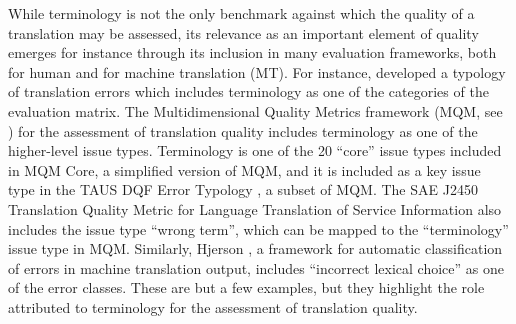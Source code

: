 While terminology is not the only benchmark against which the quality of a translation may be assessed, its relevance as an important element of quality emerges for instance through its inclusion in many evaluation frameworks, both for human and for machine translation (MT). For instance, \citet{mertin2006prozessorientiertes} developed a typology of translation errors which includes terminology as one of the categories of the evaluation matrix. The Multidimensional Quality Metrics framework (MQM, see \citealt{lommeletal2014MQMdef,lommeletal2014using}) for the assessment of translation quality includes terminology as one of the higher-level issue types. Terminology is one of the 20 ``core'' issue types included in MQM Core, a simplified version of MQM, and it is included as a key issue type in the TAUS DQF Error Typology \citep{gorogQualityEvaluationToday2014,gorogQuantifyingBenchmarkingQuality2014}, a subset of MQM. The SAE J2450 Translation Quality Metric for Language Translation of Service Information \citep{SAEJ24502001} also includes the issue type ``wrong term'', which can be mapped to the ``terminology'' issue type in MQM. Similarly, Hjerson \citep[59]{popovic2011hjerson}, a framework for automatic classification of errors in machine translation output, includes ``incorrect lexical choice'' as one of the error classes. These are but a few examples, but they highlight the role attributed to terminology for the assessment of translation quality.\largerpage

